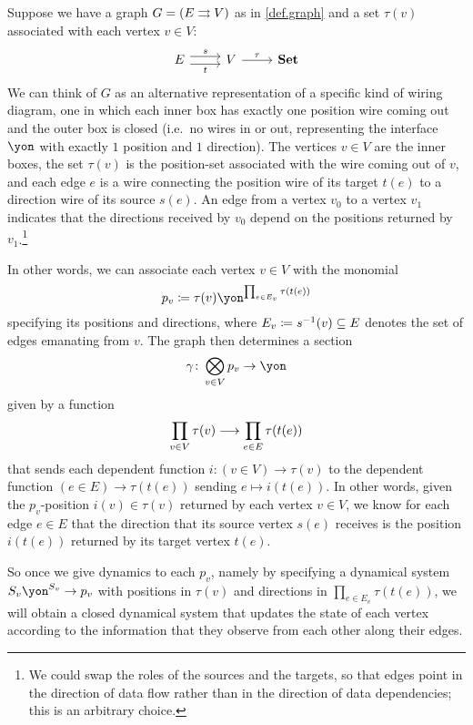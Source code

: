 \documentclass[Book-Poly]{subfiles}
\begin{document}
\begin{example}\label{ex.graph_interaction} %
Suppose we have a graph $G=(E\rightrightarrows V)$ as in \cref{def.graph} and a set $\tau(v)$ associated with each vertex $v\in V$:
\[
\begin{tikzcd}
	E\ar[r, shift left=3pt, "s"]\ar[r, shift right=3pt, "t"']&
	V\ar[r, "\tau"]&
	\smset
\end{tikzcd}
\]
We can think of $G$ as an alternative representation of a specific kind of wiring diagram, one in which each inner box has exactly one position wire coming out and the outer box is closed (i.e.\ no wires in or out, representing the interface $\yon$ with exactly $1$ position and $1$ direction).
The vertices $v\in V$ are the inner boxes, the set $\tau(v)$ is the position-set associated with the wire coming out of $v$, and each edge $e$ is a wire connecting the position wire of its target $t(e)$ to a direction wire of its source $s(e)$.
An edge from a vertex $v_0$ to a vertex $v_1$ indicates that the directions received by $v_0$ depend on the positions returned by $v_1$.\footnote{We could swap the roles of the sources and the targets, so that edges point in the direction of data flow rather than in the direction of data dependencies; this is an arbitrary choice.}

In other words, we can associate each vertex $v\in V$ with the monomial
\[
	p_v\coloneqq\tau(v)\yon^{\prod_{e\in E_v}\tau(t(e))}
\]
specifying its positions and directions, where $E_v\coloneqq s^{-1}(v)\subseteq E$ denotes the set of edges emanating from $v$.
The graph then determines a section
\[
\gamma\colon\bigotimes_{v\in V}p_v\to\yon
\]
given by a function
\[
    \prod_{v\in V}\tau(v)\longrightarrow\prod_{e\in E}\tau(t(e))
\]
that sends each dependent function $i\colon(v\in V)\to\tau(v)$ to the dependent function $(e\in E)\to\tau(t(e))$ sending $e\mapsto i(t(e))$.
In other words, given the $p_v$-position $i(v)\in\tau(v)$ returned by each vertex $v\in V$, we know for each edge $e\in E$ that the direction that its source vertex $s(e)$ receives is the position $i(t(e))$ returned by its target vertex $t(e)$.

So once we give dynamics to each $p_v$, namely by specifying a dynamical system $S_v\yon^{S_v}\to p_v$ with positions in $\tau(v)$ and directions in $\prod_{e\in E_v}\tau(t(e))$, we will obtain a closed dynamical system that updates the state of each vertex according to the information that they observe from each other along their edges.


\end{example}
\end{document}
